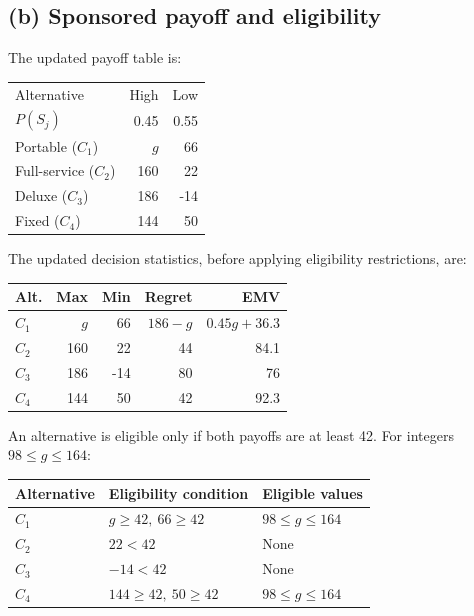 \label{sol:q2b}
\subsection*{(b) Sponsored payoff and eligibility }

The updated payoff table is:

\begin{center}\small\setlength{\tabcolsep}{4pt}
	\begin{tabular}{lrr}\toprule
		Alternative & High & Low\\
		$P(S_j)$ & 0.45 & 0.55\\ \midrule
				Portable ($C_1$) & $g$ & 66\\
		Full-service ($C_2$) & 160 & 22\\
		Deluxe ($C_3$) & 186 & -14\\
		Fixed ($C_4$) & 144 & 50\\
		\bottomrule
	\end{tabular}
\end{center}

The updated decision statistics, before applying
eligibility restrictions, are:

\begin{center}\small\setlength{\tabcolsep}{4pt}
	\begin{tabular}{lrrrr}\toprule
		Alt. & Max & Min & Regret & EMV\\ \midrule
				$C_1$ & $g$ & 66 & $186-g$ & $0.45g+36.3$\\
		$C_2$ & 160 & 22 & 44 & 84.1\\
		$C_3$ & 186 & -14 & 80 & 76\\
		$C_4$ & 144 & 50 & 42 & 92.3\\
		\bottomrule
	\end{tabular}
\end{center}

An alternative is eligible only if both payoffs
are at least 42. For integers $98\le g\le164$:

\begin{center}
\begin{tabular}{lll}\toprule
Alternative & Eligibility condition & Eligible values\\\midrule
$C_1$ & $g\ge42,\ 66\ge42$ & $98\le g\le164$\\
$C_2$ & $22<42$ & None\\
$C_3$ & $-14<42$ & None\\
$C_4$ & $144\ge42,\ 50\ge42$ & $98\le g\le164$\\
\bottomrule
\end{tabular}
\end{center}


